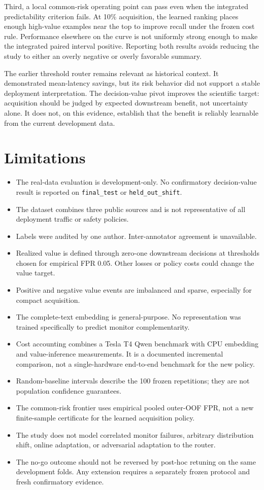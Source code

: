 \documentclass[11pt,a4paper]{article}
\newcommand{\code}[1]{\texttt{#1}}
\begin{document}
Third, a local common-risk operating point can pass even when the integrated predictability criterion fails. At 10\% acquisition, the learned ranking places enough high-value examples near the top to improve recall under the frozen cost rule. Performance elsewhere on the curve is not uniformly strong enough to make the integrated paired interval positive. Reporting both results avoids reducing the study to either an overly negative or overly favorable summary.

The earlier threshold router remains relevant as historical context. It demonstrated mean-latency savings, but its risk behavior did not support a stable deployment interpretation. The decision-value pivot improves the scientific target: acquisition should be judged by expected downstream benefit, not uncertainty alone. It does not, on this evidence, establish that the benefit is reliably learnable from the current development data.

\section{Limitations}

\begin{itemize}
  \item The real-data evaluation is development-only. No confirmatory decision-value result is reported on \code{final\_test} or \code{held\_out\_shift}.
  \item The dataset combines three public sources and is not representative of all deployment traffic or safety policies.
  \item Labels were audited by one author. Inter-annotator agreement is unavailable.
  \item Realized value is defined through zero-one downstream decisions at thresholds chosen for empirical FPR 0.05. Other losses or policy costs could change the value target.
  \item Positive and negative value events are imbalanced and sparse, especially for compact acquisition.
  \item The complete-text embedding is general-purpose. No representation was trained specifically to predict monitor complementarity.
  \item Cost accounting combines a Tesla T4 Qwen benchmark with CPU embedding and value-inference measurements. It is a documented incremental comparison, not a single-hardware end-to-end benchmark for the new policy.
  \item Random-baseline intervals describe the 100 frozen repetitions; they are not population confidence guarantees.
  \item The common-risk frontier uses empirical pooled outer-OOF FPR, not a new finite-sample certificate for the learned acquisition policy.
  \item The study does not model correlated monitor failures, arbitrary distribution shift, online adaptation, or adversarial adaptation to the router.
  \item The no-go outcome should not be reversed by post-hoc retuning on the same development folds. Any extension requires a separately frozen protocol and fresh confirmatory evidence.
\end{itemize}
\end{document}
